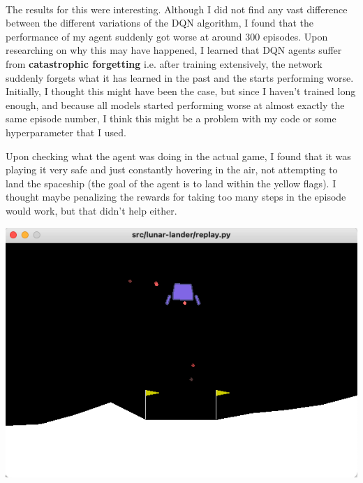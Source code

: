 \documentclass[paper=a4, fontsize=11pt, margin=1in]{scrartcl}
\numberwithin{equation}{section}		%
\numberwithin{figure}{section}			%
\numberwithin{table}{section}				%
\begin{document}
\begin{itemize}
\begin{figure}[h]
\begin{tabular}{ll}
    \end{tabular}
    \end{figure}\\
    The results for this were interesting. Although I did not find any vast difference between the different variations of the DQN algorithm, I found that the performance of my agent suddenly got worse at around 300 episodes. Upon researching on why this may have happened, I learned that DQN agents suffer from \textbf{catastrophic forgetting} i.e. after training extensively, the network suddenly forgets what it has learned in the past and the starts performing worse. Initially, I thought this might have been the case, but since I haven't trained long enough, and because all models started performing worse at almost exactly the same episode number, I think this might be a problem with my code or some hyperparameter that I used.

    Upon checking what the agent was doing in the actual game, I found that it was playing it very safe and just constantly hovering in the air, not attempting to land the spaceship (the goal of the agent is to land within the yellow flags). I thought maybe penalizing the rewards for taking too many steps in the episode would work, but that didn't help either.
     \begin{center}
    \includegraphics[scale=0.5]{check.png}
    \end{center}
\end{itemize}
\end{document}
